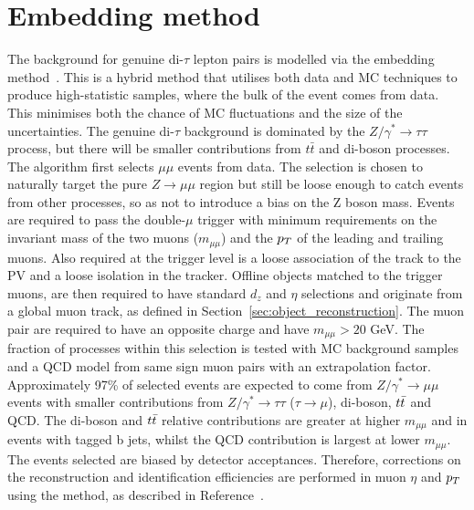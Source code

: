\section{Embedding method}
\label{sec:embedding}

The background for genuine di-$\tau$ lepton pairs is modelled via the embedding method~\cite{CMS_embedding}. 
This is a hybrid method that utilises both data and \ac{MC} techniques to produce high-statistic samples, where the bulk of the event comes from data.
This minimises both the chance of \ac{MC} fluctuations and the size of the uncertainties.
The genuine di-$\tau$ background is dominated by the $Z/\gamma^{*} \rightarrow \tau \tau$ process, but there will be smaller contributions from $t\bar{t}$ and di-boson processes.  \\

The algorithm first selects $\mu\mu$ events from data.
The selection is chosen to naturally target the pure $Z \rightarrow \mu\mu$ region but still be loose enough to catch events from other processes, so as not to introduce a bias on the Z boson mass.
Events are required to pass the double-$\mu$ trigger with minimum requirements on the invariant mass of the two muons ($m_{\mu\mu}$) and the $p_{T}$ of the leading and trailing muons.
Also required at the trigger level is a loose association of the track to the \ac{PV} and a loose isolation in the tracker.
Offline objects matched to the trigger muons, are then required to have standard $d_z$ and $\eta$ selections and originate from a global muon track, as defined in Section~\ref{sec:object_reconstruction}.
The muon pair are required to have an opposite charge and have $m_{\mu\mu} > 20$ GeV.
The fraction of processes within this selection is tested with \ac{MC} background samples and a \ac{QCD} model from same sign muon pairs with an extrapolation factor.
Approximately 97\% of selected events are expected to come from $Z/\gamma^* \rightarrow \mu\mu$ events with smaller contributions from $Z/\gamma^* \rightarrow \tau\tau$ ($\tau\rightarrow\mu$), di-boson, $t\bar{t}$ and QCD.
The di-boson and $t\bar{t}$ relative contributions are greater at higher $m_{\mu\mu}$ and in events with tagged b jets, whilst the \ac{QCD} contribution is largest at lower $m_{\mu\mu}$.
The events selected are biased by detector acceptances. 
Therefore, corrections on the reconstruction and identification efficiencies are performed in muon $\eta$ and $p_{T}$ using the  method, as described in Reference~\cite{CMS:2010svw}. \\

